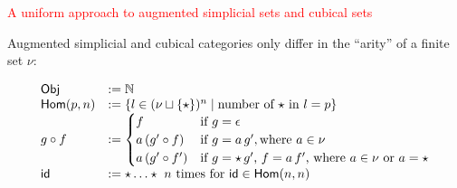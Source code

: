 \documentclass[12pt,landscape]{article}
\begin{document}
\begin{LARGE}
\begin{sf}
\newpage

\begin{center}
\textcolor{red}{\huge A uniform approach to augmented simplicial sets and cubical sets}
\end{center}


\medskip

Augmented simplicial and cubical categories only differ in the
``arity'' of a finite set $\nu$:

$$
  \begin{array}{ll}
    \mathsf{Obj}       & := \mathbb{N}\\
    \mathsf{Hom}(p, n) & := \{l \in (\nu \sqcup \{\star\})^n \mid \text{number of $\star$ in $l = p$}\} \\
    g \circ f             & :=
    \begin{cases}
      f                & \text{if $g = \epsilon$}                                                   \\
      a\,(g' \circ f)  & \text{if $g = a\,g'$}, \text{where $a \in \nu$}                            \\
      a\,(g' \circ f') & \text{if $g = \star\,g'$, $f = a\,f'$, where $a \in \nu$ or $a = \star$} \\
    \end{cases}            \\
    \mathsf{id}                   & := \star \ldots \star \text{ $n$ times for $\mathsf{id} \in \mathsf{Hom}(n, n)$}
  \end{array}
$$


\end{sf}
\end{LARGE}
\end{document}
